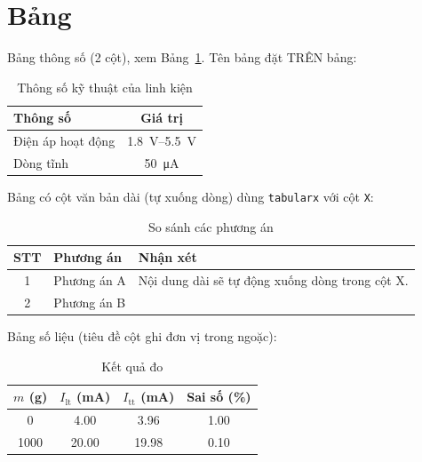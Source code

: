 \section{Bảng}
\label{sec:cX:bang}

Bảng thông số (2 cột), xem Bảng~\ref{tab:cX:thong-so}. Tên bảng đặt TRÊN bảng:
\begin{table}[H]
    \centering
    \caption{Thông số kỹ thuật của linh kiện}
    \label{tab:cX:thong-so}
    \renewcommand{\arraystretch}{1.3}
    \begin{tabular}{|l|c|}
        \hline
        \textbf{Thông số} & \textbf{Giá trị} \\ \hline
        Điện áp hoạt động & \qtyrange{1.8}{5.5}{\volt} \\ \hline
        Dòng tĩnh         & \qty{50}{\micro\ampere} \\ \hline
    \end{tabular}
\end{table}

Bảng có cột văn bản dài (tự xuống dòng) dùng \texttt{tabularx} với cột \texttt{X}:
\begin{table}[H]
    \centering
    \caption{So sánh các phương án}
    \label{tab:cX:so-sanh}
    \renewcommand{\arraystretch}{1.3}
    \begin{tabularx}{\textwidth}{|c|l|X|}
        \hline
        \textbf{STT} & \textbf{Phương án} & \textbf{Nhận xét} \\ \hline
        1 & Phương án A & Nội dung dài sẽ tự động xuống dòng trong cột X. \\ \hline
        2 & Phương án B & \TODO{} \\ \hline
    \end{tabularx}
\end{table}

Bảng số liệu (tiêu đề cột ghi đơn vị trong ngoặc):
\begin{table}[H]
    \centering
    \caption{Kết quả đo}
    \label{tab:cX:ket-qua}
    \renewcommand{\arraystretch}{1.3}
    \begin{tabular}{|c|c|c|c|}
        \hline
        \textbf{$m$ (\unit{\gram})} & \textbf{$I_{\mathrm{lt}}$ (\unit{\milli\ampere})} &
        \textbf{$I_{\mathrm{tt}}$ (\unit{\milli\ampere})} & \textbf{Sai số (\unit{\percent})} \\ \hline
        0    & 4.00  & 3.96  & 1.00 \\ \hline
        1000 & 20.00 & 19.98 & 0.10 \\ \hline
    \end{tabular}
\end{table}

